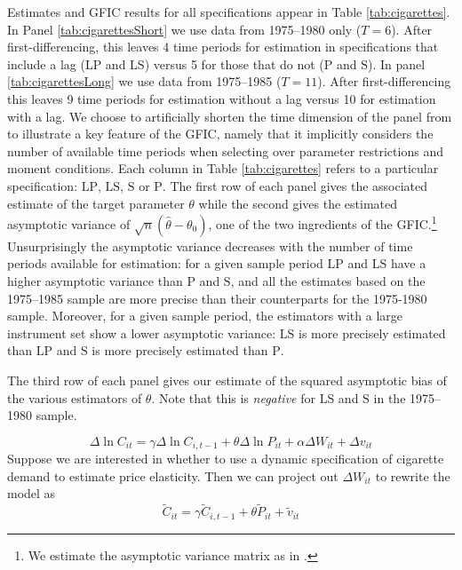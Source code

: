 Estimates and GFIC results for all specifications appear in Table \ref{tab:cigarettes}.
In Panel \ref{tab:cigarettesShort} we use data from 1975--1980 only ($T=6$).
After first-differencing, this leaves 4 time periods for estimation in specifications that include a lag ($\text{LP}$ and $\text{LS}$) versus 5 for those that do not ($\text{P}$ and $\text{S}$).
In panel \ref{tab:cigarettesLong} we use data from 1975--1985 ($T=11$).
After first-differencing this leaves 9 time periods for estimation without a lag versus 10 for estimation with a lag.
We choose to artificially shorten the time dimension of the panel from \cite{BaltagiEtAl2000} to illustrate a key feature of the GFIC, namely that it implicitly considers the number of available time periods when selecting over parameter restrictions and moment conditions. 
Each column in Table \ref{tab:cigarettes} refers to a particular specification: $\text{LP}$, $\text{LS}$, $\text{S}$ or $\text{P}$.
The first row of each panel gives the associated estimate of the target parameter $\theta$ while the second gives the estimated asymptotic variance of $\sqrt{n}(\widehat{\theta} - \theta_0)$, one of the two ingredients of the GFIC.\footnote{We estimate the asymptotic variance matrix as in \cite{BaltagiEtAl2000}.}
Unsurprisingly the asymptotic variance decreases with the number of time periods available for estimation: for a given sample period $\text{LP}$ and $\text{LS}$ have a higher asymptotic variance than $\text{P}$ and $\text{S}$, and all the estimates based on the 1975--1985 sample are more precise than their counterparts for the 1975-1980 sample.
Moreover, for a given sample period, the estimators with a large instrument set show a lower asymptotic variance: $\text{LS}$ is more precisely estimated than $\text{LP}$ and $\text{S}$ is more precisely estimated than $\text{P}$.

The third row of each panel gives our estimate of the squared asymptotic bias of the various estimators of $\theta$.
Note that this is \emph{negative} for $\text{LS}$ and $\text{S}$ in the 1975--1980 sample.


\newpage

\[
\Delta \ln C_{it} = \gamma \Delta \ln C_{i,t-1} +  \theta \Delta \ln P_{it} +\alpha \Delta W_{it} +  \Delta v_{it}
\]
 Suppose we are interested in whether to use a dynamic specification of cigarette demand to estimate price elasticity. Then we can project out $\Delta W_{it}$ to rewrite the model as
\[
\widetilde{C}_{it} = \gamma \widetilde{C}_{i,t-1} + \theta \widetilde{P}_{it} + \widetilde{v}_{it} 
\] 
 
